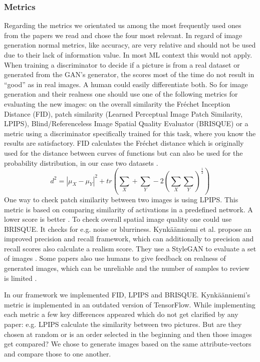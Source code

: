 \documentclass[12pt, a4paper]{article}
\begin{document}
\subsubsection{Metrics}\label{metrics}
Regarding the metrics we orientated us among the most frequently used ones from the papers we read and chose the four most relevant. 
In regard of image generation normal metrics, like accuracy, are very relative and should not be used due to their lack of information value. In most ML context this would not apply. When training a discriminator to decide if a picture is from a real dataset or generated from the GAN's generator, the scores most of the time do not result in ``good'' as in real images. A human could easily differentiate both. 
So for image generation and their realness one should use one of the following metrics for evaluating the new images: on the overall similarity the Fréchet Inception Distance (FID), patch similarity (Learned Perceptual Image Patch Similarity, LPIPS), Blind/Referenceless Image Spatial Quality Evaluator (BRISQUE) or a metric using a discriminator specifically trained for this task, where you know the results are satisfactory.
FID calculates the Fréchet distance which is originally used for the distance between curves of functions but can also be used for the probability distribution, in our case two datasets \cite{NIPS2017_8a1d6947}. $$d^2 = |\mu_X - \mu_Y|^2 + tr(\sum_X + \sum_Y - 2 (\sum_X \sum_Y)^{\frac{1}{2}})$$
One way to check patch similarity between two images is using LPIPS. This metric is based on comparing similarity of activations in a predefined network. A lower score is better \cite{DBLP}. 
To check overall spatial image quality one could use BRISQUE. It checks for e.g. noise or blurriness. 
Kynkäänniemi et al. propose an improved precision and recall framework, which can additionally to precision and recall scores also calculate a realism score. They use a StyleGAN to evaluate a set of images \cite{NEURIPS2019_0234c510}.
Some papers also use humans to give feedback on realness of generated images, which can be unreliable and the number of samples to review is limited \cite{Xia_2021_CVPR}.

In our framework we implemented FID, LPIPS and BRISQUE. Kynkäänniemi's metric is implemented in an outdated version of TensorFlow. 
While implementing each metric a few key differences appeared which do not get clarified by any paper: e.g. LPIPS calculate the similarity between two pictures. 
But are they chosen at random or is an order selected in the beginning and then those images get compared? We chose to generate images based on the same attribute-vectors and compare those to one another.
\end{document}
